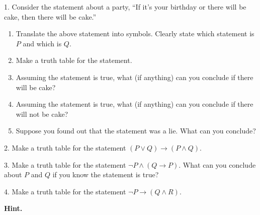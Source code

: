 \documentclass[10pt,]{book}
\theoremstyle{plain}
\theoremstyle{definition}
\numberwithin{equation}{chapter}
\def\imp{\rightarrow}
\begin{document}
\begin{exerciselist}
\item[1.]\hypertarget{exercise-226}{}
          Consider the statement about a party, ``If it's your birthday or there will be cake, then there will be cake.''
\leavevmode%
\begin{enumerate}[label=(\alph*)]
\item\hypertarget{li-634}{}
              Translate the above statement into symbols. Clearly state which statement is \(P\) and which is \(Q\).
\item\hypertarget{li-635}{}
              Make a truth table for the statement.
\item\hypertarget{li-636}{}
              Assuming the statement is true, what (if anything) can you conclude if there will be cake?
\item\hypertarget{li-637}{}
              Assuming the statement is true, what (if anything) can you conclude if there will not be cake?
\item\hypertarget{li-638}{}
              Suppose you found out that the statement was a lie. What can you conclude?
\end{enumerate}
\par\smallskip
\item[2.]\hypertarget{exercise-227}{}
          Make a truth table for the statement \((P \vee Q) \imp (P \wedge Q)\).
\par\smallskip
\item[3.]\hypertarget{exercise-228}{}
          Make a truth table for the statement \(\neg P \wedge (Q \imp P)\). What can you conclude about \(P\) and \(Q\) if you know the statement is true?
\par\smallskip
\item[4.]\hypertarget{exercise-229}{}
          Make a truth table for the statement \(\neg P \imp (Q \wedge R)\).
\par\smallskip
\par\smallskip
\noindent\textbf{Hint.}\hypertarget{hint-12}{}\quad


\end{exerciselist}
\end{document}
